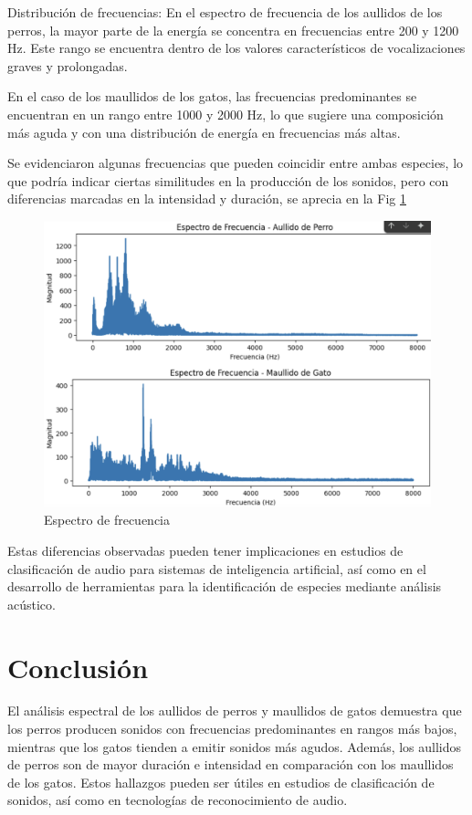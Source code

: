 \documentclass[journal]{IEEEtran}
\begin{document}
Distribución de frecuencias: En el espectro de frecuencia de los aullidos de los perros, la mayor parte de la energía se concentra en frecuencias entre 200 y 1200 Hz. Este rango se encuentra dentro de los valores característicos de vocalizaciones graves y prolongadas.

En el caso de los maullidos de los gatos, las frecuencias predominantes se encuentran en un rango entre 1000 y 2000 Hz, lo que sugiere una composición más aguda y con una distribución de energía en frecuencias más altas.

Se evidenciaron algunas frecuencias que pueden coincidir entre ambas especies, lo que podría indicar ciertas similitudes en la producción de los sonidos, pero con diferencias marcadas en la intensidad y duración, se aprecia en la Fig \ref{fig:freq}

\begin{figure}
    \centering
    \includegraphics[width=0.5\linewidth]{Figs/freq.png}
    \caption{Espectro de frecuencia}
    \label{fig:freq}
\end{figure}

Estas diferencias observadas pueden tener implicaciones en estudios de clasificación de audio para sistemas de inteligencia artificial, así como en el desarrollo de herramientas para la identificación de especies mediante análisis acústico.

\section{Conclusión}
El análisis espectral de los aullidos de perros y maullidos de gatos demuestra que los perros producen sonidos con frecuencias predominantes en rangos más bajos, mientras que los gatos tienden a emitir sonidos más agudos. Además, los aullidos de perros son de mayor duración e intensidad en comparación con los maullidos de los gatos. Estos hallazgos pueden ser útiles en estudios de clasificación de sonidos, así como en tecnologías de reconocimiento de audio.
\ifCLASSOPTIONcaptionsoff
  \newpage
\fi
\end{document}
